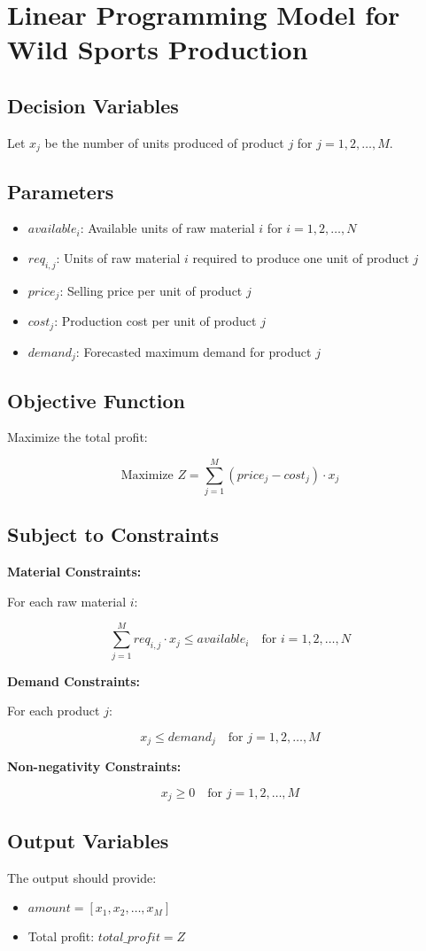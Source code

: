 \documentclass{article}
\begin{document}
\section*{Linear Programming Model for Wild Sports Production}

\subsection*{Decision Variables}
Let \( x_j \) be the number of units produced of product \( j \) for \( j = 1, 2, \ldots, M \).

\subsection*{Parameters}
\begin{itemize}
    \item \( available_i \): Available units of raw material \( i \) for \( i = 1, 2, \ldots, N \)
    \item \( req_{i,j} \): Units of raw material \( i \) required to produce one unit of product \( j \)
    \item \( price_j \): Selling price per unit of product \( j \)
    \item \( cost_j \): Production cost per unit of product \( j \)
    \item \( demand_j \): Forecasted maximum demand for product \( j \)
\end{itemize}

\subsection*{Objective Function}
Maximize the total profit:

\[
\text{Maximize } Z = \sum_{j=1}^{M} (price_j - cost_j) \cdot x_j
\]

\subsection*{Subject to Constraints}

\textbf{Material Constraints:}

For each raw material \( i \):

\[
\sum_{j=1}^{M} req_{i,j} \cdot x_j \leq available_i \quad \text{for } i = 1, 2, \ldots, N
\]

\textbf{Demand Constraints:}

For each product \( j \):

\[
x_j \leq demand_j \quad \text{for } j = 1, 2, \ldots, M
\]

\textbf{Non-negativity Constraints:}

\[
x_j \geq 0 \quad \text{for } j = 1, 2, \ldots, M
\]

\subsection*{Output Variables}
The output should provide:
\begin{itemize}
    \item \( amount = [x_1, x_2, \ldots, x_M] \)
    \item Total profit: \( total\_profit = Z \)
\end{itemize}
\end{document}
